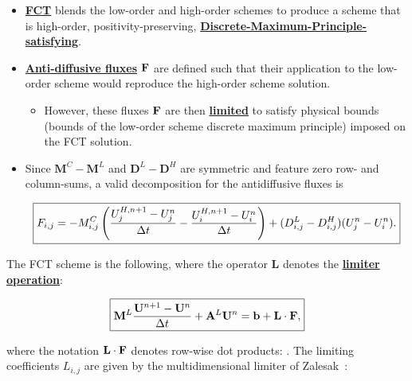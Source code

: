 \begin{itemize}
\item \underline{\bf FCT} blends the low-order and high-order schemes
to produce a scheme
that is high-order, positivity-preserving, \underline{\bf Discrete-Maximum-Principle-satisfying}.
\item 
\underline{\bf Anti-diffusive fluxes} $\textcolor{black}{\mathbf{F}}$  are defined such that their application to the
low-order scheme would reproduce the high-order scheme solution.
\begin{itemize}
\item
However, these fluxes $\textcolor{black}{\mathbf{F}}$ are then \underline{\bf limited} to satisfy
physical bounds (bounds of the low-order scheme discrete
maximum principle) imposed on the FCT solution.
\end{itemize}
\item 
Since $\mathbf{M}^C-\mathbf{M}^L$ and $\mathbf{D}^L-\mathbf{D}^H$ are symmetric
and feature zero row- and column-sums, a valid decomposition for
the antidiffusive fluxes is

\begin{equation}
\boxed{
   \textcolor{black}{F_{i,j}} = -M_{i,j}^C\left(\frac{U^{H,n+1}_j-U^n_j}{\Delta t}
   - \frac{U^{H,n+1}_i-U^n_i}{\Delta t}\right)
   + (D_{i,j}^L-D_{i,j}^H)(U^n_j - U^n_i).
}
\end{equation}
\end{itemize}

The FCT scheme is the following, where the operator
$\mathbf{L}$ denotes the \underline{\bf limiter operation}:

\begin{equation}\label{eq:FCTscheme}
\boxed{
   \mathbf{M}^L\frac{\mathbf{U}^{n+1}-\mathbf{U}^n}{\Delta t}
      + \mathbf{A}^L\mathbf{U}^n
      = \mathbf{b} + \textcolor{black}{\mathbf{L}\cdot\mathbf{F}},
}
\end{equation}

where the notation $\textcolor{black}{\mathbf{L}}\cdot\mathbf{F}$ denotes row-wise dot products:
.
The limiting coefficients $L_{i,j}$ are given by the multidimensional
limiter of Zalesak~\cite{zalesak}:

